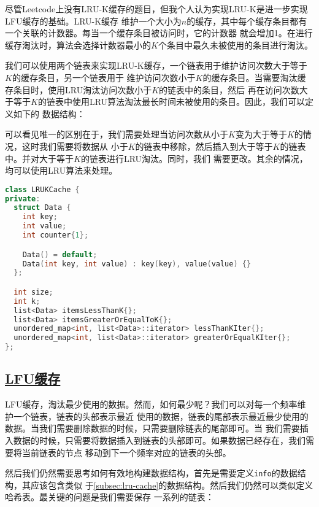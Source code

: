 \documentclass[../../main.tex]{subfiles}
\begin{document}
尽管Leetcode上没有LRU-K缓存的题目，但我个人认为实现LRU-K是进一步实现LFU缓存的基础。LRU-K缓存
维护一个大小为$n$的缓存，其中每个缓存条目都有一个关联的计数器。每当一个缓存条目被访问时，它的计数器
就会增加1。在进行缓存淘汰时，算法会选择计数器最小的$K$个条目中最久未被使用的条目进行淘汰。

我们可以使用两个链表来实现LRU-K缓存，一个链表用于维护访问次数大于等于$K$的缓存条目，另一个链表用于
维护访问次数小于$K$的缓存条目。当需要淘汰缓存条目时，使用LRU淘汰访问次数小于$K$的链表中的条目，然后
再在访问次数大于等于$K$的链表中使用LRU算法淘汰最长时间未被使用的条目。因此，我们可以定义如下的
数据结构：

可以看见唯一的区别在于，我们需要处理当访问次数从小于$K$变为大于等于$K$的情况，这时我们需要将数据从
小于$K$的链表中移除，然后插入到大于等于$K$的链表中。并对大于等于$K$的链表进行LRU淘汰。同时，我们
需要更改。其余的情况，均可以使用LRU算法来处理。

\begin{lstlisting}[language=C++,style=kaolstplain]
class LRUKCache {
private:
  struct Data {
    int key;
    int value;
    int counter{1};

    Data() = default;
    Data(int key, int value) : key(key), value(value) {}
  };

  int size;
  int k;
  list<Data> itemsLessThanK{};
  list<Data> itemsGreaterOrEqualToK{};
  unordered_map<int, list<Data>::iterator> lessThanKIter{};
  unordered_map<int, list<Data>::iterator> greaterOrEqualKIter{};
};
\end{lstlisting}

\subsection{\href{https://leetcode-cn.com/problems/lfu-cache/}{LFU缓存}}

LFU缓存，淘汰最少使用的数据。然而，如何最少呢？我们可以对每一个频率维护一个链表，链表的头部表示最近
使用的数据，链表的尾部表示最近最少使用的数据。当我们需要删除数据的时候，只需要删除链表的尾部即可。当
我们需要插入数据的时候，只需要将数据插入到链表的头部即可。如果数据已经存在，我们需要将当前链表的节点
移动到下一个频率对应的链表的头部。

然后我们仍然需要思考如何有效地构建数据结构，首先是需要定义\texttt{info}的数据结构，其应该包含类似
于\ref{subsec:lru-cache}的数据结构。然后我们仍然可以类似定义哈希表。最关键的问题是我们需要保存
一系列的链表：
\end{document}

